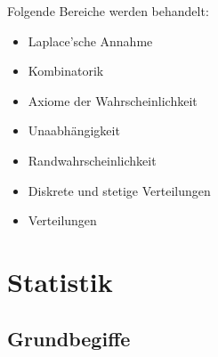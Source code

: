 \documentclass[12pt]{scrartcl}
\begin{document}
Folgende Bereiche werden behandelt:
\begin{itemize}
    \item Laplace'sche Annahme
    \item Kombinatorik
    \item Axiome der Wahrscheinlichkeit
    \item Unaabhängigkeit
    \item Randwahrscheinlichkeit
    \item Diskrete und stetige Verteilungen
    \item Verteilungen
\end{itemize}

\pagebreak

\section{Statistik}

\subsection{Grundbegiffe}
\end{document}
